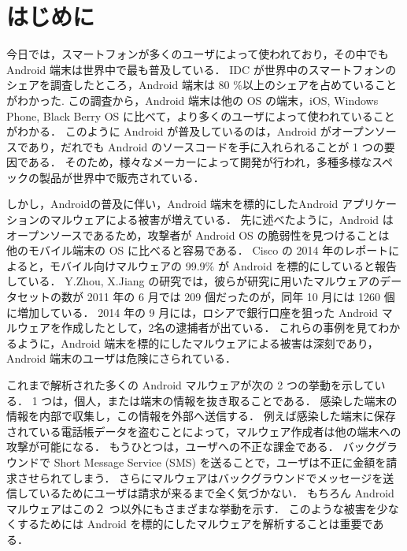 \section{はじめに}
\label{sec:intro}
今日では，スマートフォンが多くのユーザによって使われており，その中でも Android 端末は世界中で最も普及している．
IDC が世界中のスマートフォンのシェアを調査したところ，Android 端末は 80 \%以上のシェアを占めていることがわかった\cite{osshare}.
この調査から，Android 端末は他の OS の端末，iOS, Windows Phone, Black Berry OS に比べて，より多くのユーザによって使われていることがわかる．
このように Android が普及しているのは，Android がオープンソースであり，だれでも Android のソースコードを手に入れられることが 1 つの要因である．
そのため，様々なメーカーによって開発が行われ，多種多様なスペックの製品が世界中で販売されている．

しかし，Androidの普及に伴い，Android 端末を標的にしたAndroid アプリケーションのマルウェアによる被害が増えている．
先に述べたように，Android はオープンソースであるため，攻撃者が Android OS の脆弱性を見つけることは 他のモバイル端末の OS に比べると容易である．
Cisco の 2014 年のレポート\cite{cisco}によると，モバイル向けマルウェアの 99.9\% が Android を標的にしていると報告している．
Y.Zhou, X.Jiang の研究\cite{dissect}では，彼らが研究に用いたマルウェアのデータセットの数が 2011 年の 6 月では 209 個だったのが，同年 10 月には 1260 個に増加している．
2014 年の 9 月には，ロシアで銀行口座を狙った Android マルウェアを作成したとして，2名の逮捕者が出ている．
これらの事例を見てわかるように，Android 端末を標的にしたマルウェアによる被害は深刻であり，Android 端末のユーザは危険にさられている．

これまで解析された多くの Android マルウェアが次の 2 つの挙動を示している．
1 つは，個人，または端末の情報を抜き取ることである．
感染した端末の情報を内部で収集し，この情報を外部へ送信する．
例えば感染した端末に保存されている電話帳データを盗むことによって，マルウェア作成者は他の端末への攻撃が可能になる．
もうひとつは，ユーザへの不正な課金である．
バックグラウンドで Short Message Service (SMS) を送ることで，ユーザは不正に金額を請求させられてしまう．
さらにマルウェアはバックグラウンドでメッセージを送信しているためにユーザは請求が来るまで全く気づかない．
もちろん Android マルウェアはこの２ つ以外にもさまざまな挙動を示す．
このような被害を少なくするためには Android を標的にしたマルウェアを解析することは重要である．

